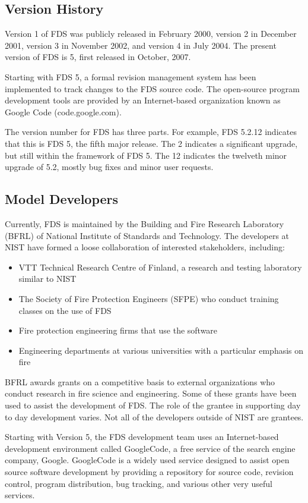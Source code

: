 \documentclass[11pt]{book}
\begin{document}
\subsection{Version History}

Version 1 of FDS was publicly released in February 2000, version 2
in December 2001, version 3 in November 2002, and version 4 in July 2004.
The present version of FDS is 5, first released in October, 2007.

Starting with FDS 5, a formal revision management system has been implemented to track changes to the FDS source
code. The open-source program development tools are provided by an Internet-based organization known as Google Code (code.google.com).

The version number for FDS has three parts.  For example, FDS 5.2.12
indicates that this is FDS 5, the fifth major release. The 2 indicates
a significant upgrade, but still within the framework of FDS 5.  The
12 indicates the twelveth minor upgrade of 5.2, mostly bug fixes and
minor user requests.


\subsection{Model Developers}


Currently, FDS is maintained by the Building and Fire Research Laboratory (BFRL) of National Institute of Standards and Technology. The developers
at NIST have formed a loose collaboration of interested stakeholders, including:
\begin{itemize}
\item VTT Technical Research Centre of Finland, a research and testing
laboratory similar to NIST
\item The Society of Fire Protection Engineers (SFPE) who conduct training classes on the use of FDS
\item Fire protection engineering firms that use the software
\item Engineering departments at various universities with a particular emphasis on fire
\end{itemize}
BFRL awards grants on a competitive basis to external organizations who conduct research in fire science and engineering. Some of these grants have
been used to assist the development of FDS. The role of the grantee in supporting day to day development varies. Not all of the developers outside
of NIST are grantees.

Starting with Version 5, the FDS development team uses
an Internet-based development
environment called GoogleCode, a free service of the search engine company, Google. GoogleCode is a widely used service designed to assist
open source software development by providing a repository for source
code, revision control, program distribution, bug tracking, and
various other very useful services.
\end{document}
